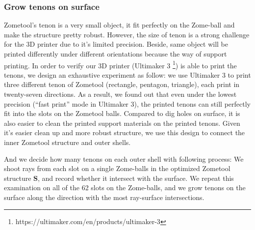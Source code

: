 \subsubsection{Grow tenons on surface}
Zometool's tenon is a very small object, it fit perfectly on the Zome-ball and make the structure pretty robust. 
However, the size of tenon is a strong challenge for the 3{D} printer due to it's limited precision. 
Beside, same object will be printed differently under different orientations because the way of support printing.
In order to verify our 3{D} printer (Ultimaker 3 \footnote{https://ultimaker.com/en/products/ultimaker-3}) is able to print the tenons, we design an exhaustive experiment as follow:
we use Ultimaker 3 to print three different tenon of Zometool (rectangle, pentagon, triangle), each print in twenty-seven directions. 
As a result, we found out that even under the lowest precision (``fast print'' mode in Ultimaker 3), the printed tenons can still perfectly fit into the slots on the Zometool balls.
Compared to dig holes on surface, it is also easier to clean the printed support materials on the printed tenons.
Given it's easier clean up and more robust structure, we use this design to connect the inner Zometool structure and outer shells. 

And we decide how many tenons on each outer shell with following process:
We shoot rays from each slot on a single Zome-balls in the optimized Zometool structure $\mathbf{S}$, and record whether it intersect with the surface.
We repeat this examination on all of the 62 slots on the Zome-balls, and we grow tenons on the surface along the direction with the most ray-surface intersections.

    
